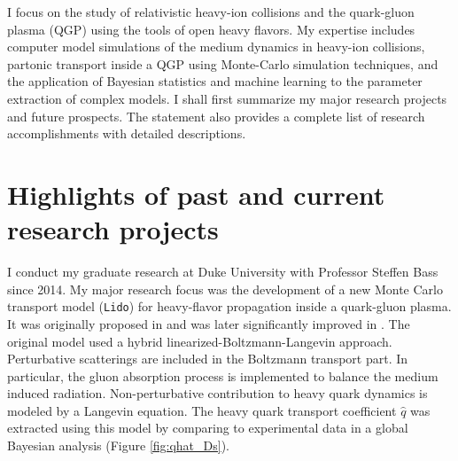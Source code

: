 \documentclass[12pt,a4paper]{revtex4-1}
\begin{document}
I focus on the study of relativistic heavy-ion collisions and the quark-gluon plasma (QGP) using the tools of open heavy flavors.
My expertise includes computer model simulations of the medium dynamics in heavy-ion collisions, partonic transport inside a QGP using Monte-Carlo simulation techniques, and the application of Bayesian statistics and machine learning to the parameter extraction of complex models.
I shall first summarize my major research projects and future prospects. The statement also provides a complete list of research accomplishments with detailed descriptions.


\section*{Highlights of past and current research projects}
I conduct my graduate research at Duke University with Professor Steffen Bass since 2014.
My major research focus was the development of a new Monte Carlo transport model ({\tt Lido}) for heavy-flavor propagation inside a quark-gluon plasma. It was originally proposed in \cite{Ke:2018tsh} and was later significantly improved in \cite{Ke:2018jem}.
The original model used a hybrid linearized-Boltzmann-Langevin approach. Perturbative scatterings are included in the Boltzmann transport part. 
In particular, the gluon absorption process is implemented to balance the medium induced radiation. 
Non-perturbative contribution to heavy quark dynamics is modeled by a Langevin equation.
The heavy quark transport coefficient $\hat{q}$ was extracted using this model by comparing to experimental data in a global Bayesian analysis (Figure \ref{fig:qhat_Ds}).
\end{document}
